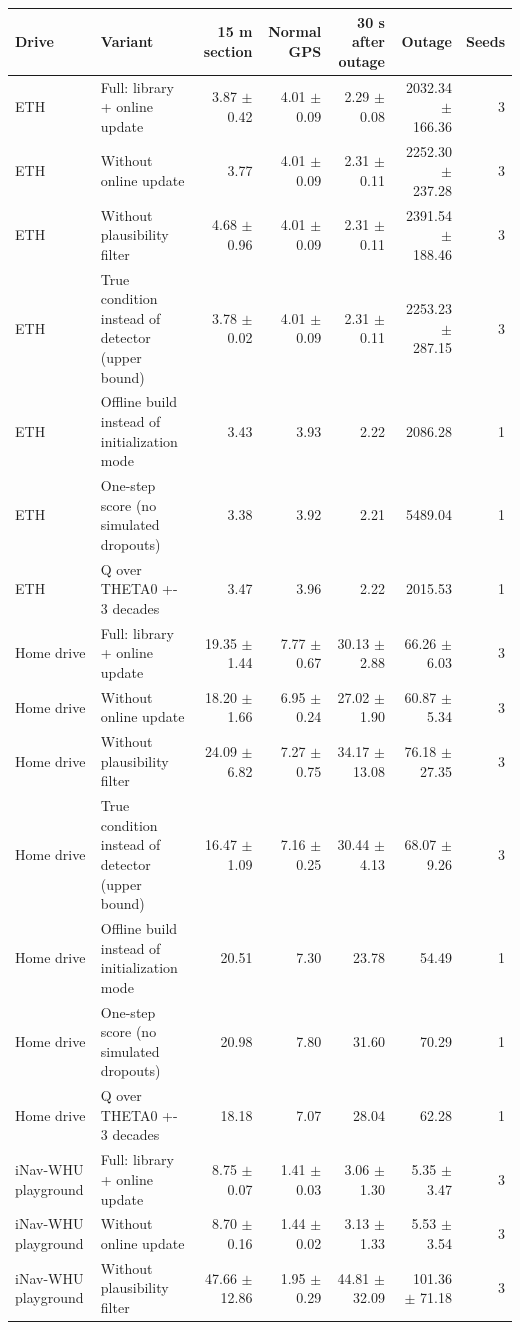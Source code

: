 \begin{tabular}{llrrrrr}
\toprule
Drive & Variant & 15 m section & Normal GPS & 30 s after outage & Outage & Seeds \\
\midrule
ETH & Full: library + online update & 3.87 $\pm$ 0.42 & 4.01 $\pm$ 0.09 & 2.29 $\pm$ 0.08 & 2032.34 $\pm$ 166.36 & 3 \\
ETH & Without online update & 3.77 & 4.01 $\pm$ 0.09 & 2.31 $\pm$ 0.11 & 2252.30 $\pm$ 237.28 & 3 \\
ETH & Without plausibility filter & 4.68 $\pm$ 0.96 & 4.01 $\pm$ 0.09 & 2.31 $\pm$ 0.11 & 2391.54 $\pm$ 188.46 & 3 \\
ETH & True condition instead of detector (upper bound) & 3.78 $\pm$ 0.02 & 4.01 $\pm$ 0.09 & 2.31 $\pm$ 0.11 & 2253.23 $\pm$ 287.15 & 3 \\
ETH & Offline build instead of initialization mode & 3.43 & 3.93 & 2.22 & 2086.28 & 1 \\
ETH & One-step score (no simulated dropouts) & 3.38 & 3.92 & 2.21 & 5489.04 & 1 \\
ETH & Q over THETA0 +- 3 decades & 3.47 & 3.96 & 2.22 & 2015.53 & 1 \\
Home drive & Full: library + online update & 19.35 $\pm$ 1.44 & 7.77 $\pm$ 0.67 & 30.13 $\pm$ 2.88 & 66.26 $\pm$ 6.03 & 3 \\
Home drive & Without online update & 18.20 $\pm$ 1.66 & 6.95 $\pm$ 0.24 & 27.02 $\pm$ 1.90 & 60.87 $\pm$ 5.34 & 3 \\
Home drive & Without plausibility filter & 24.09 $\pm$ 6.82 & 7.27 $\pm$ 0.75 & 34.17 $\pm$ 13.08 & 76.18 $\pm$ 27.35 & 3 \\
Home drive & True condition instead of detector (upper bound) & 16.47 $\pm$ 1.09 & 7.16 $\pm$ 0.25 & 30.44 $\pm$ 4.13 & 68.07 $\pm$ 9.26 & 3 \\
Home drive & Offline build instead of initialization mode & 20.51 & 7.30 & 23.78 & 54.49 & 1 \\
Home drive & One-step score (no simulated dropouts) & 20.98 & 7.80 & 31.60 & 70.29 & 1 \\
Home drive & Q over THETA0 +- 3 decades & 18.18 & 7.07 & 28.04 & 62.28 & 1 \\
iNav-WHU playground & Full: library + online update & 8.75 $\pm$ 0.07 & 1.41 $\pm$ 0.03 & 3.06 $\pm$ 1.30 & 5.35 $\pm$ 3.47 & 3 \\
iNav-WHU playground & Without online update & 8.70 $\pm$ 0.16 & 1.44 $\pm$ 0.02 & 3.13 $\pm$ 1.33 & 5.53 $\pm$ 3.54 & 3 \\
iNav-WHU playground & Without plausibility filter & 47.66 $\pm$ 12.86 & 1.95 $\pm$ 0.29 & 44.81 $\pm$ 32.09 & 101.36 $\pm$ 71.18 & 3 \\

\end{tabular}
